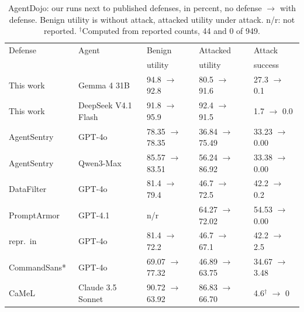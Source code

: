 \begin{table}[t]
\caption{AgentDojo: our runs next to published defenses, in percent, no defense $\to$ with defense. Benign utility is without attack, attacked utility under attack. n/r: not reported. $^\dagger$Computed from reported counts, 44 and 0 of 949.}
\label{tab:agentdojo}
\footnotesize\setlength{\tabcolsep}{2.4pt}
\begin{tabular}{@{}>{\raggedright\arraybackslash}p{0.8in}>{\raggedright\arraybackslash}p{0.6in}lll@{}}
\toprule
Defense & Agent & Benign & Attacked & Attack \\
 & & utility & utility & success \\
\midrule
This work & Gemma 4 31B & 94.8 $\to$ 92.8 & 80.5 $\to$ 91.6 & 27.3 $\to$ 0.1 \\
This work & DeepSeek V4.1 Flash & 91.8 $\to$ 95.9 & 92.4 $\to$ 91.5 & 1.7 $\to$ 0.0 \\
AgentSentry~\cite{zhang2026agentsentry} & GPT-4o & 78.35 $\to$ 78.35 & 36.84 $\to$ 75.49 & 33.23 $\to$ 0.00 \\
AgentSentry~\cite{zhang2026agentsentry} & Qwen3-Max & 85.57 $\to$ 83.51 & 56.24 $\to$ 86.92 & 33.38 $\to$ 0.00 \\
DataFilter~\cite{wang2026datafilter} & GPT-4o & 81.4 $\to$ 79.4 & 46.7 $\to$ 72.5 & 42.2 $\to$ 0.2 \\
PromptArmor~\cite{shi2025promptarmor} & GPT-4.1 & n/r & 64.27 $\to$ 72.02 & 54.53 $\to$ 0.00 \\
\quad repr.\ in~\cite{wang2026datafilter} & GPT-4o & 81.4 $\to$ 72.2 & 46.7 $\to$ 67.1 & 42.2 $\to$ 2.5 \\
CommandSans*~\cite{das2025commandsans} & GPT-4o & 69.07 $\to$ 77.32 & 46.89 $\to$ 63.75 & 34.67 $\to$ 3.48 \\
CaMeL~\cite{debenedetti2025camel} & Claude 3.5 Sonnet & 90.72 $\to$ 63.92 & 86.83 $\to$ 66.70 & 4.6$^\dagger$ $\to$ 0 \\
\bottomrule
\end{tabular}
\end{table}
